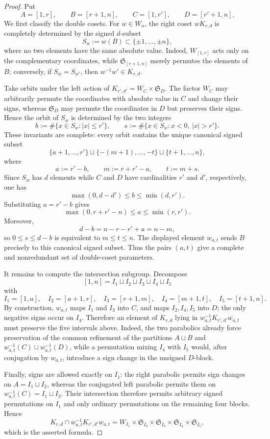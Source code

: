 \documentclass[10pt,a4paper]{amsart}
\def\min{{\operatorname{min}\nolimits}}
\begin{document}
\begin{proof}
Put
\[
A=[1,r],\qquad B=[r+1,n],\qquad
C=[1,r'],\qquad D=[r'+1,n].
\]
We first classify the double cosets.  For $w\in W_n$, the right coset
$wK_{r,d}$ is completely determined by the signed $d$-subset
\[
S_w:=w(B)\subset\{\pm1,\ldots,\pm n\},
\]
where no two elements have the same absolute value.  Indeed,
$W_{[1,r]}$ acts only on the complementary coordinates, while
$\mathfrak S_{[r+1,n]}$ merely permutes the elements of $B$; conversely,
if $S_w=S_{w'}$, then $w^{-1}w'\in K_{r,d}$.

Take orbits under the left action of
$K_{r',d'}=W_C\times\mathfrak S_D$.  The factor $W_C$ may arbitrarily
permute the coordinates with absolute value in $C$ and change their
signs, whereas $\mathfrak S_D$ may permute the coordinates in $D$ but
preserves their signs.  Hence the orbit of $S_w$ is determined by the two
integers
\[
b:=\#\{x\in S_w:|x|\le r'\},
\qquad
s:=\#\{x\in S_w:x<0,\ |x|>r'\}.
\]
These invariants are complete: every orbit contains the unique canonical
signed subset
\[
\{a+1,\ldots,r'\}
\sqcup
\{-(m+1),\ldots,-t\}
\sqcup
\{t+1,\ldots,n\},
\]
where
\[
a:=r'-b,\qquad
m:=r+r'-a,\qquad
t:=m+s.
\]
Since $S_w$ has $d$ elements while $C$ and $D$ have cardinalities
$r'$ and $d'$, respectively, one has
\[
\max(0,d-d')\le b\le\min(d,r').
\]
Substituting $a=r'-b$ gives
\[
\max(0,r+r'-n)\le a\le\min(r,r').
\]
Moreover,
\[
d-b=n-r-r'+a=n-m,
\]
so $0\le s\le d-b$ is equivalent to $m\le t\le n$.
The displayed element $w_{a,t}$ sends $B$ precisely to this canonical
signed subset.  Thus the pairs $(a,t)$ give a complete and nonredundant
set of double-coset parameters.

It remains to compute the intersection subgroup.  Decompose
\[
[1,n]=I_1\sqcup I_2\sqcup I_3\sqcup I_4\sqcup I_5
\]
with
\[
I_1=[1,a],\quad I_2=[a+1,r],\quad I_3=[r+1,m],
\quad I_4=[m+1,t],\quad I_5=[t+1,n].
\]
By construction, $w_{a,t}$ maps $I_1$ and $I_3$ into $C$, and maps
$I_2,I_4,I_5$ into $D$; the only negative signs occur on $I_4$.
Therefore an element of $K_{r,d}$ lying in
$w_{a,t}^{-1}K_{r',d'}w_{a,t}$ must preserve the five intervals above.
Indeed, the two parabolics already force preservation of the common
refinement of the partitions $A\sqcup B$ and
$w_{a,t}^{-1}(C)\sqcup w_{a,t}^{-1}(D)$, while a permutation mixing
$I_4$ with $I_5$ would, after conjugation by $w_{a,t}$, introduce a sign
change in the unsigned $D$-block.

Finally, signs are allowed exactly on $I_1$: the right parabolic permits
sign changes on $A=I_1\sqcup I_2$, whereas the conjugated left parabolic
permits them on $w_{a,t}^{-1}(C)=I_1\sqcup I_3$.  Their intersection
therefore permits arbitrary signed permutations on $I_1$ and only
ordinary permutations on the remaining four blocks.  Hence
\[
K_{r,d}\cap w_{a,t}^{-1}K_{r',d'}w_{a,t}
=
W_{I_1}\times\mathfrak S_{I_2}\times\mathfrak S_{I_3}
\times\mathfrak S_{I_4}\times\mathfrak S_{I_5},
\]
which is the asserted formula.
\end{proof}
\end{document}
